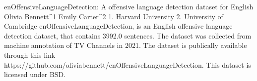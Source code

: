 
enOffensiveLanguageDetection: A offensive language detection dataset for English
Olivia Bennett^1 Emily Carter^2
1. Harvard University 2. University of Cambridge
enOffensiveLanguageDetection, is an English offensive language detection dataset, that contains 3992.0 sentences.
The dataset was collected from machine annotation of TV Channels in 2021. 
The dataset is publically available through this link https://github.com/oliviabennett/enOffensiveLanguageDetection. This dataset is licensed under BSD.

